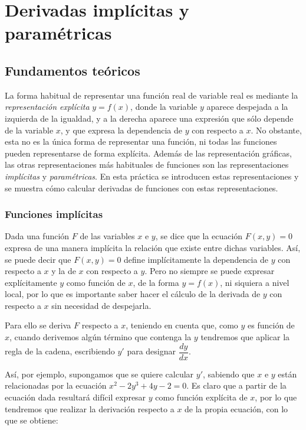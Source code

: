 \chapter{Derivadas implícitas y paramétricas}

\section{Fundamentos teóricos}
La forma habitual de representar una función real de variable real
es mediante la \emph{representación explícita} $y=f(x)$, donde la
variable $y$ aparece despejada a la izquierda de la igualdad, y a la
derecha aparece una expresión que sólo depende de la variable $x$, y
que expresa la dependencia de $y$ con respecto a $x$. No obstante,
esta no es la única forma de representar una función, ni todas las
funciones pueden representarse de forma explícita. Además de las
representación gráficas, las otras representaciones más habituales
de funciones son las representaciones \emph{implícitas} y
\emph{paramétricas}. En esta práctica se introducen estas
representaciones y se muestra cómo calcular derivadas de funciones
con estas representaciones.

\subsection*{Funciones implícitas}

Dada una función $F$ de las variables $x$ e $y$, se dice que la ecuación $F(x,y)=0$ expresa de una manera implícita la relación que existe entre dichas variables. Así, se puede decir que $F(x,y)=0$ define implícitamente la dependencia de $y$ con respecto a $x$ y la de $x$ con respecto a $y$. Pero no siempre se puede expresar explícitamente $y$ como función de $x$, de la forma $y=f(x)$, ni siquiera a nivel local, por lo que es importante saber hacer el cálculo de la derivada de $y$ con respecto a $x$ sin necesidad de despejarla.

Para ello se deriva $F$ respecto a $x$, teniendo en cuenta que, como $y$ es función de $x$, cuando derivemos algún término que contenga la $y$ tendremos que aplicar la regla de la cadena, escribiendo $y'$ para designar $\dfrac{dy}{dx}$.

Así, por ejemplo, supongamos que se quiere calcular $y'$, sabiendo que $x$ e $y$ están relacionadas por la ecuación $x^2-2y^3+4y-2=0$. Es claro que a partir de la ecuación dada resultará difícil expresar $y$ como función explícita de $x$, por lo que tendremos que realizar la derivación respecto a $x$ de la propia ecuación, con lo que se obtiene:

